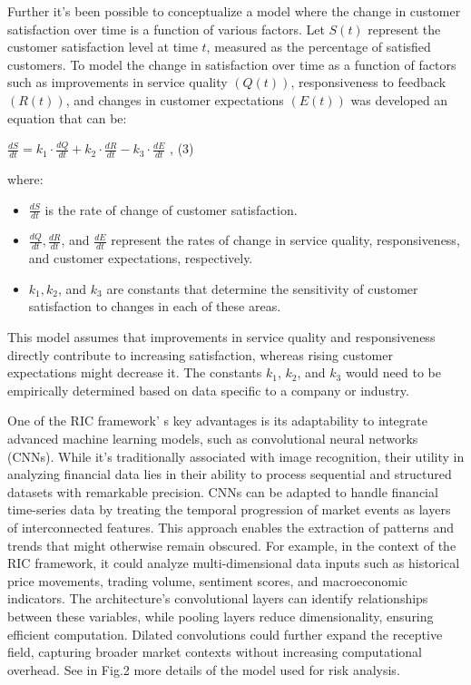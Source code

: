 {Further it's been possible to conceptualize a model where the change in
customer satisfaction over time is a function of various factors. Let
\(S(t)\) represent the customer satisfaction level at time \(t\),
measured as the percentage of satisfied customers. To model the change
in satisfaction over time as a function of factors such as improvements
in service quality \((Q(t))\), responsiveness to feedback \((R(t))\),
and changes in customer expectations \((E(t))\) was developed an
equation that can be:

\(\frac{dS}{dt} = k_{1} \cdot \frac{dQ}{dt} + k_{2} \cdot \frac{dR}{dt} - k_{3} \cdot \frac{dE}{dt}\)
, (3)

where:

\begin{itemize}
\item
  \(\frac{dS}{dt}\) is the rate of change of customer satisfaction.
\item
  \(\frac{dQ}{dt},\frac{dR}{dt}\), and \(\frac{dE}{dt}\) represent the
  rates of change in service quality, responsiveness, and customer
  expectations, respectively.
\item
  \(k_{1},k_{2}\), and \(k_{3}\) are constants that determine the
  sensitivity of customer satisfaction to changes in each of these
  areas.
\end{itemize}

This model assumes that improvements in service quality and
responsiveness directly contribute to increasing satisfaction, whereas
rising customer expectations might decrease it. The constants \(k_{1}\),
\(k_{2}\), and \(k_{3}\) would need to be empirically determined based
on data specific to a company or industry.

One of the RIC framework' s key advantages is its
adaptability to integrate advanced machine learning models, such as
convolutional neural networks (CNNs). While it's traditionally
associated with image recognition, their utility in analyzing financial
data lies in their ability to process sequential and structured datasets
with remarkable precision. CNNs can be adapted to handle financial
time-series data by treating the temporal progression of market events
as layers of interconnected features. This approach enables the
extraction of patterns and trends that might otherwise remain obscured.
For example, in the context of the RIC framework, it could analyze
multi-dimensional data inputs such as historical price movements,
trading volume, sentiment scores, and macroeconomic indicators. The
architecture's convolutional layers can identify relationships between
these variables, while pooling layers reduce dimensionality, ensuring
efficient computation. Dilated convolutions could further expand the
receptive field, capturing broader market contexts without increasing
computational overhead. See in Fig.2 more details of the model used for
risk analysis.

}
